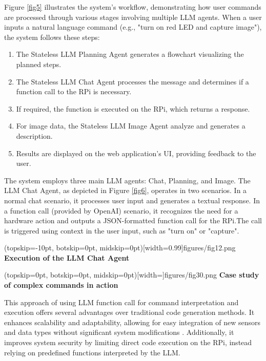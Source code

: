 \documentclass{ieeeaccess}
\begin{document}
Figure \ref{fig5} illustrates the system's workflow, demonstrating how user commands are processed through various stages involving multiple LLM agents. When a user inputs a natural language command (e.g., "turn on red LED and capture image"), the system follows these steps:

\begin{enumerate}
    \item The Stateless LLM Planning Agent generates a flowchart visualizing the planned steps.
    \item The Stateless LLM Chat Agent processes the message and determines if a function call to the RPi is necessary.
    \item If required, the function is executed on the RPi, which returns a response.
    \item For image data, the Stateless LLM Image Agent analyze and generates a description.
    \item Results are displayed on the web application's UI, providing feedback to the user.
\end{enumerate}



The system employs three main LLM agents: Chat, Planning, and Image. The LLM Chat Agent, as depicted in Figure \ref{fig6}, operates in two scenarios. In a normal chat scenario, it processes user input and generates a textual response. In a function call (provided by OpenAI) scenario, it recognizes the need for a hardware action and outputs a JSON-formatted function call for the RPi.The call is triggered using context in the user input, such as "turn on" or "capture".

\Figure[h!](topskip=-10pt, botskip=0pt,
midskip=0pt)[width=0.99\columnwidth]{{figures/fig12.png}}
{ \textbf{Execution of the LLM Chat Agent}\label{fig6}}

\Figure[t!](topskip=0pt, botskip=0pt,
midskip=0pt)[width=\textwidth]{{figures/fig30.png}}
{ \textbf{Case study of complex commands in action}\label{fig7}}

This approach of using LLM function call for command interpretation and execution offers several advantages over traditional code generation methods. It enhances scalability and adaptability, allowing for easy integration of new sensors and data types without significant system modifications \cite{yang2023autogptonlinedecisionmaking}. Additionally, it improves system security by limiting direct code execution on the RPi, instead relying on predefined functions interpreted by the LLM.
\end{document}

